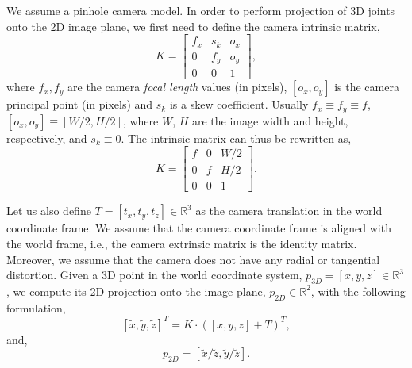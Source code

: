 \documentclass[runningheads]{llncs}
\begin{document}
We assume a pinhole camera model. In order to perform projection of 3D joints onto the 2D image plane, we first need to define the camera intrinsic matrix,
\begin{equation}
\label{eq:intrinsic_matrix0}
K = 
\begin{bmatrix}
f_x & s_k & o_x\\
0 & f_y & o_y\\
0 & 0 & 1
\end{bmatrix},
\end{equation}
where $ f_x, f_y $ are the camera \emph{focal length} values (in pixels), $ [o_x , o_y] $ is the camera principal point (in pixels) and $s_k$ is a skew coefficient. Usually $ f_x \equiv f_y\equiv f $, $ [o_x , o_y] \equiv  [W/2, H/2] $, where $ W $, $ H $ are the image width and height, respectively, and $s_k\equiv 0$. The intrinsic matrix can thus be rewritten as,
\begin{equation}
\label{eq:intrinsic_matrix}
K = 
\begin{bmatrix}
f & 0 & W/2\\
0 & f & H/2\\
0 & 0 & 1
\end{bmatrix}.
\end{equation}


Let us also define $ T = [t_x, t_y, t_z] \in \mathbb{R} ^ 3$ as the camera translation in the world coordinate frame. We assume that the  camera coordinate frame is aligned with the world frame, i.e., the camera extrinsic matrix is the identity matrix. Moreover, we assume that the camera does not have any radial or tangential distortion. Given a 3D point in the world coordinate system, $ p_{3D} = [x, y, z] \in \mathbb{R} ^ 3$, we compute its 2D projection onto the image plane, $ p_{2D}\in \mathbb{R} ^ 2$, with the following formulation,
\begin{equation}
\label{eq:projection}
\left[\widetilde x, \widetilde y, \widetilde z \right]^T=  K \cdot \left([x, y, z] + T\right)^T,
\end{equation}
and,
\begin{equation}
\label{eq:projection1}
p_{2D}= \left[\widetilde x/\widetilde z , \widetilde y/ \widetilde z \right].
\end{equation}
\end{document}
